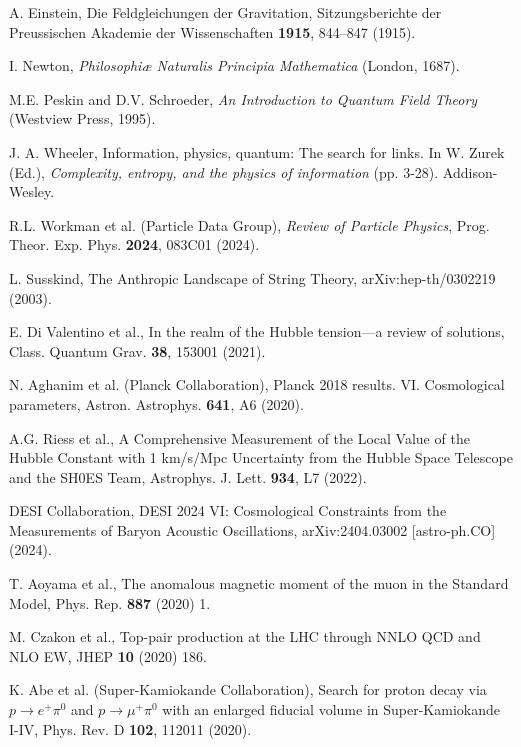 \documentclass[11pt,a4paper]{article}
\begin{document}
\begin{thebibliography}{99}

A. Einstein,
Die Feldgleichungen der Gravitation,
Sitzungsberichte der Preussischen Akademie der Wissenschaften \textbf{1915}, 844--847 (1915).

I. Newton,
\textit{Philosophiæ Naturalis Principia Mathematica}
(London, 1687).

M.E. Peskin and D.V. Schroeder,
\textit{An Introduction to Quantum Field Theory}
(Westview Press, 1995).

J. A. Wheeler, Information, physics, quantum: The search for links. In W. Zurek (Ed.), \textit{Complexity, entropy, and the physics of information} (pp. 3-28). Addison-Wesley.

R.L. Workman et al. (Particle Data Group),
\textit{Review of Particle Physics},
Prog. Theor. Exp. Phys. \textbf{2024}, 083C01 (2024).

L. Susskind,
The Anthropic Landscape of String Theory,
arXiv:hep-th/0302219 (2003).

E. Di Valentino et al.,
In the realm of the Hubble tension—a review of solutions,
Class. Quantum Grav. \textbf{38}, 153001 (2021).

N. Aghanim et al. (Planck Collaboration),
Planck 2018 results. VI. Cosmological parameters,
Astron. Astrophys. \textbf{641}, A6 (2020).

A.G. Riess et al.,
A Comprehensive Measurement of the Local Value of the Hubble Constant with 1 km/s/Mpc Uncertainty from the Hubble Space Telescope and the SH0ES Team,
Astrophys. J. Lett. \textbf{934}, L7 (2022).

DESI Collaboration,
DESI 2024 VI: Cosmological Constraints from the Measurements of Baryon Acoustic Oscillations,
arXiv:2404.03002 [astro-ph.CO] (2024).

T. Aoyama et al., The anomalous magnetic moment of the muon in the Standard Model, Phys. Rep. \textbf{887} (2020) 1.

M. Czakon et al., Top-pair production at the LHC through NNLO QCD and NLO EW, JHEP \textbf{10} (2020) 186.

K. Abe et al. (Super-Kamiokande Collaboration),
Search for proton decay via \(p \to e^+ \pi^0\) and \(p \to \mu^+ \pi^0\) with an enlarged fiducial volume in Super-Kamiokande I-IV,
Phys. Rev. D \textbf{102}, 112011 (2020).


\end{thebibliography}
\end{document}
